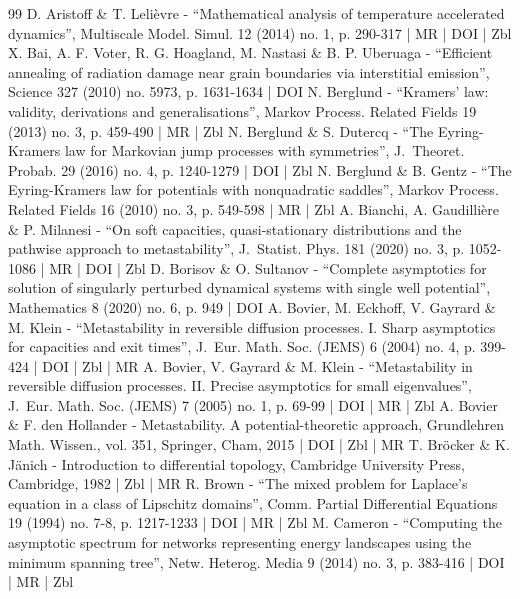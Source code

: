 \begin{thebibliography}{99}
D. Aristoff \& T. Lelièvre - “Mathematical analysis of temperature accelerated dynamics”, Multiscale Model. Simul. 12 (2014) no. 1, p. 290-317 | MR | DOI | Zbl
X. Bai, A. F. Voter, R. G. Hoagland, M. Nastasi \& B. P. Uberuaga - “Efficient annealing of radiation damage near grain boundaries via interstitial emission”, Science 327 (2010) no. 5973, p. 1631-1634 | DOI
N. Berglund - “Kramers’ law: validity, derivations and generalisations”, Markov Process. Related Fields 19 (2013) no. 3, p. 459-490 | MR | Zbl
N. Berglund \& S. Dutercq - “The Eyring-Kramers law for Markovian jump processes with symmetries”, J. Theoret. Probab. 29 (2016) no. 4, p. 1240-1279 | DOI | Zbl
N. Berglund \& B. Gentz - “The Eyring-Kramers law for potentials with nonquadratic saddles”, Markov Process. Related Fields 16 (2010) no. 3, p. 549-598 | MR | Zbl
A. Bianchi, A. Gaudillière \& P. Milanesi - “On soft capacities, quasi-stationary distributions and the pathwise approach to metastability”, J. Statist. Phys. 181 (2020) no. 3, p. 1052-1086 | MR | DOI | Zbl
D. Borisov \& O. Sultanov - “Complete asymptotics for solution of singularly perturbed dynamical systems with single well potential”, Mathematics 8 (2020) no. 6, p. 949 | DOI
A. Bovier, M. Eckhoff, V. Gayrard \& M. Klein - “Metastability in reversible diffusion processes. I. Sharp asymptotics for capacities and exit times”, J. Eur. Math. Soc. (JEMS) 6 (2004) no. 4, p. 399-424 | DOI | Zbl | MR
A. Bovier, V. Gayrard \& M. Klein - “Metastability in reversible diffusion processes. II. Precise asymptotics for small eigenvalues”, J. Eur. Math. Soc. (JEMS) 7 (2005) no. 1, p. 69-99 | DOI | MR | Zbl
A. Bovier \& F. den Hollander - Metastability. A potential-theoretic approach, Grundlehren Math. Wissen., vol. 351, Springer, Cham, 2015 | DOI | Zbl | MR
T. Bröcker \& K. Jänich - Introduction to differential topology, Cambridge University Press, Cambridge, 1982 | Zbl | MR
R. Brown - “The mixed problem for Laplace’s equation in a class of Lipschitz domains”, Comm. Partial Differential Equations 19 (1994) no. 7-8, p. 1217-1233 | DOI | MR | Zbl
M. Cameron - “Computing the asymptotic spectrum for networks representing energy landscapes using the minimum spanning tree”, Netw. Heterog. Media 9 (2014) no. 3, p. 383-416 | DOI | MR | Zbl

\end{thebibliography}
